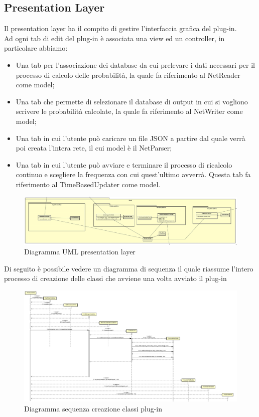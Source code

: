 \subsection{Presentation Layer}
Il presentation layer ha il compito di gestire l'interfaccia grafica del plug-in.\\
Ad ogni tab di edit del plug-in è associata una view ed un controller, in particolare abbiamo:
\begin{itemize}
	\item Una tab per l’associazione dei database da cui prelevare i dati necessari per il processo di calcolo delle probabilità, la quale fa riferimento al NetReader come model;
	\item Una tab che permette di selezionare il database di output in cui si vogliono scrivere le probabilità calcolate, la quale fa riferimento al NetWriter come model;
	\item Una tab in cui l'utente può caricare un file JSON a partire dal quale verrà poi creata l'intera rete, il cui model è il NetParser;
	\item Una tab in cui l'utente può avviare e terminare il processo di ricalcolo continuo e scegliere la frequenza con cui quest'ultimo avverrà. Questa tab fa riferimento al TimeBasedUpdater come model.
\end{itemize}
\begin{figure} [H]
	\centerline{
	\includegraphics[scale=0.22]{Img/PresentationLayer}}
	\caption{Diagramma UML presentation layer}\label{}
\end{figure}
Di seguito è possibile vedere un diagramma di sequenza il quale riassume l'intero processo di creazione delle classi che avviene una volta avviato il plug-in
\begin{figure} [H]
	\centerline{
	\includegraphics[scale=0.25]{Img/Creazione}}
	\caption{Diagramma sequenza creazione classi plug-in}\label{}
\end{figure}
\pagebreak